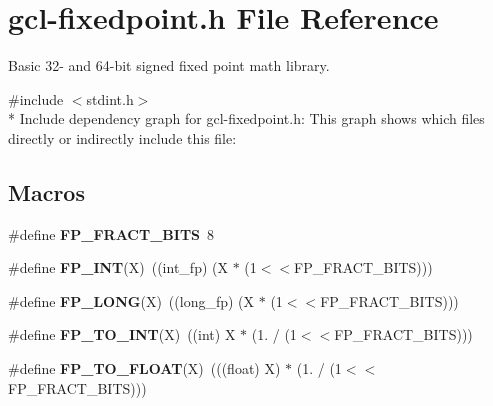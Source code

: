 \hypertarget{gcl-fixedpoint_8h}{}\section{gcl-\/fixedpoint.h File Reference}
\label{gcl-fixedpoint_8h}


Basic 32-\/ and 64-\/bit signed fixed point math library.  


{\ttfamily \#include $<$stdint.\+h$>$}\\*
Include dependency graph for gcl-\/fixedpoint.h\+:
This graph shows which files directly or indirectly include this file\+:
\subsection*{Macros}
\begin{DoxyCompactItemize}
\item 
\#define {\bfseries F\+P\+\_\+\+F\+R\+A\+C\+T\+\_\+\+B\+I\+TS}~8\hypertarget{gcl-fixedpoint_8h_acea1385611e03f002632ed59445727a6}{}\label{gcl-fixedpoint_8h_acea1385611e03f002632ed59445727a6}

\item 
\#define {\bfseries F\+P\+\_\+\+I\+NT}(X)~((int\+\_\+fp) (X $\ast$ (1$<$$<$F\+P\+\_\+\+F\+R\+A\+C\+T\+\_\+\+B\+I\+TS)))\hypertarget{gcl-fixedpoint_8h_a130dd28a7462e0fe048250f2fc98dbb2}{}\label{gcl-fixedpoint_8h_a130dd28a7462e0fe048250f2fc98dbb2}

\item 
\#define {\bfseries F\+P\+\_\+\+L\+O\+NG}(X)~((long\+\_\+fp) (X $\ast$ (1$<$$<$F\+P\+\_\+\+F\+R\+A\+C\+T\+\_\+\+B\+I\+TS)))\hypertarget{gcl-fixedpoint_8h_a7c02c1148dd417013a6ba4bd157ddb07}{}\label{gcl-fixedpoint_8h_a7c02c1148dd417013a6ba4bd157ddb07}

\item 
\#define {\bfseries F\+P\+\_\+\+T\+O\+\_\+\+I\+NT}(X)~((int) X $\ast$ (1. / (1$<$$<$F\+P\+\_\+\+F\+R\+A\+C\+T\+\_\+\+B\+I\+TS)))\hypertarget{gcl-fixedpoint_8h_a9bcd91757487d88d69433aa7bcc01c70}{}\label{gcl-fixedpoint_8h_a9bcd91757487d88d69433aa7bcc01c70}

\item 
\#define {\bfseries F\+P\+\_\+\+T\+O\+\_\+\+F\+L\+O\+AT}(X)~(((float) X) $\ast$ (1. / (1$<$$<$F\+P\+\_\+\+F\+R\+A\+C\+T\+\_\+\+B\+I\+TS)))\hypertarget{gcl-fixedpoint_8h_a292fe0f9de86226446693772ae356f91}{}\label{gcl-fixedpoint_8h_a292fe0f9de86226446693772ae356f91}

\end{DoxyCompactItemize}
